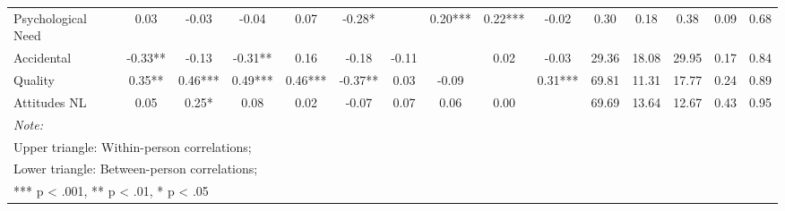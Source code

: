 \begin{table}
\begin{minipage}[t][\textheight][t]{\textwidth}
{\begin{tabular}[t]{lcccccccccccccc}
\hspace{1em}Psychological Need & 0.03 & -0.03 & -0.04 & 0.07 & -0.28* &  & 0.20*** & 0.22*** & -0.02 & 0.30 & 0.18 & 0.38 & 0.09 & 0.68\\
\hspace{1em}Accidental & -0.33** & -0.13 & -0.31** & 0.16 & -0.18 & -0.11 &  & 0.02 & -0.03 & 29.36 & 18.08 & 29.95 & 0.17 & 0.84\\
\hspace{1em}Quality & 0.35** & 0.46*** & 0.49*** & 0.46*** & -0.37** & 0.03 & -0.09 &  & 0.31*** & 69.81 & 11.31 & 17.77 & 0.24 & 0.89\\
\hspace{1em}Attitudes NL & 0.05 & 0.25* & 0.08 & 0.02 & -0.07 & 0.07 & 0.06 & 0.00 &  & 69.69 & 13.64 & 12.67 & 0.43 & 0.95\\
\bottomrule
\multicolumn{15}{l}{\rule{0pt}{1em}\textit{Note: }}\\
\multicolumn{15}{l}{\rule{0pt}{1em}Upper triangle: Within-person correlations;}\\
\multicolumn{15}{l}{\rule{0pt}{1em}Lower triangle: Between-person correlations;}\\
\multicolumn{15}{l}{\rule{0pt}{1em}*** p < .001, ** p < .01,  * p < .05}\\
\end{tabular}}
\end{minipage}
\end{table}
